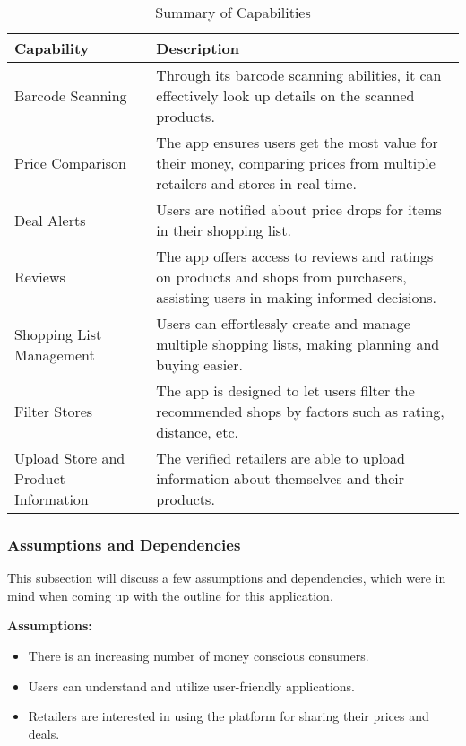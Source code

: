 \begin{table}[ht]
	\centering
	\begin{tabularx}{\textwidth}{|p{2cm}|X|}
		\hline
		\textbf{Capability} & \textbf{Description} \\ 
		\hline
		Barcode Scanning & Through its barcode scanning abilities, it can effectively look up details on the scanned products. \\ 
		\hline
		Price Comparison & The app ensures users get the most value for their money, comparing prices from multiple retailers and stores in real-time. \\ 
		\hline
		Deal Alerts & Users are notified about price drops for items in their shopping list.\\ 
		\hline
		Reviews & The app offers access to reviews and ratings on products and shops from purchasers, assisting users in making informed decisions. \\ 
		\hline
		Shopping List Management & Users can effortlessly create and manage multiple shopping lists, making planning and buying easier. \\ 
		\hline
		Filter Stores & The app is designed to let users filter the recommended shops by factors such as rating, distance, etc. \\ 
		\hline
		Upload Store and Product Information & The verified retailers are able to upload information about themselves and their products. \\ 
		\hline
	\end{tabularx}
	\caption{Summary of Capabilities}
	\label{tab:cap}
\end{table}

\pagebreak

\subsubsection{Assumptions and Dependencies}

This subsection will discuss a few assumptions and dependencies, which were in mind when coming up with the outline for this application. 

\textbf{Assumptions:}

\begin{itemize}
	\item There is an increasing number of money conscious consumers.
	\item Users can understand and utilize user-friendly applications.
	\item Retailers are interested in using the platform for sharing their prices and deals.
\end{itemize}

